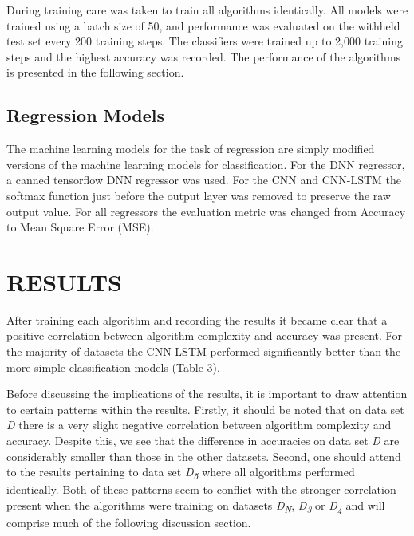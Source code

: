 \documentclass[letterpaper, 10 pt, conference]{ieeeconf}  %
\begin{document}
    During training care was taken to train all algorithms identically. All models were trained using a batch size of 50, and performance was evaluated on the withheld test set every 200 training steps. The classifiers were trained up to 2,000 training steps and the highest accuracy was recorded. The performance of the algorithms is presented in the following section. 
    
\subsection{Regression Models}
    The machine learning models for the task of regression are simply modified versions of the machine learning models for classification. For the DNN regressor, a canned tensorflow DNN regressor was used. For the CNN and CNN-LSTM the softmax function just before the output layer was removed to preserve the raw output value.  For all regressors the evaluation metric was changed from Accuracy to Mean Square Error (MSE). 

\section{RESULTS}
	After training each algorithm and recording the results it became clear that a positive correlation between algorithm complexity and accuracy was present. For the majority of datasets the CNN-LSTM performed significantly better than the more simple classification models (Table 3).
	
    Before discussing the implications of the results, it is important to draw attention to certain patterns within the results. Firstly, it should be noted that on data set \textit{D} there is a very slight negative correlation between algorithm complexity and accuracy. Despite this, we see that the difference in accuracies on data set \textit{D} are considerably smaller than those in the other datasets. Second, one should attend to the results pertaining to data set \textit{D\textsubscript{5}} where all algorithms performed identically. Both of these patterns seem to conflict with the stronger correlation present when the algorithms were training on datasets \textit{D\textsubscript{N}}, \textit{D\textsubscript{3}} or \textit{D\textsubscript{4}} and will comprise much of the following discussion section. 
\end{document}
